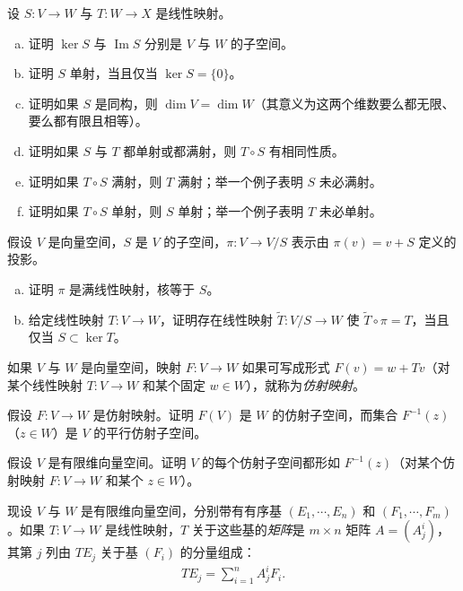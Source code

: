 \documentclass[../../main.tex]{subfiles}
\begin{document}
\begin{exercise}\label{exercise:appB-B-14}
设 $S:V\to W$ 与 $T:W\to X$ 是线性映射。
\begin{enumerate}[(a)]
\item 证明 $\ker S$ 与 $\operatorname{Im}S$ 分别是 $V$ 与 $W$ 的子空间。
\item 证明 $S$ 单射，当且仅当 $\ker S=\{0\}$。
\item 证明如果 $S$ 是同构，则 $\dim V=\dim W$（其意义为这两个维数要么都无限、要么都有限且相等）。
\item 证明如果 $S$ 与 $T$ 都单射或都满射，则 $T\circ S$ 有相同性质。
\item 证明如果 $T\circ S$ 满射，则 $T$ 满射；举一个例子表明 $S$ 未必满射。
\item 证明如果 $T\circ S$ 单射，则 $S$ 单射；举一个例子表明 $T$ 未必单射。
\end{enumerate}
\end{exercise}

\begin{exercise}\label{exercise:appB-B-15}
假设 $V$ 是向量空间，$S$ 是 $V$ 的子空间，$\pi:V\to V/S$ 表示由 $\pi(v)=v+S$ 定义的投影。
\begin{enumerate}[(a)]
\item 证明 $\pi$ 是满线性映射，核等于 $S$。
\item 给定线性映射 $T:V\to W$，证明存在线性映射 $\widetilde T:V/S\to W$ 使 $\widetilde T\circ\pi=T$，当且仅当 $S\subset\ker T$。
\end{enumerate}
\end{exercise}

如果 $V$ 与 $W$ 是向量空间，映射 $F:V\to W$ 如果可写成形式 $F(v)=w+Tv$（对某个线性映射 $T:V\to W$ 和某个固定 $w\in W$），就称为\emph{仿射映射}。

\begin{exercise}\label{exercise:appB-B-16}
假设 $F:V\to W$ 是仿射映射。证明 $F(V)$ 是 $W$ 的仿射子空间，而集合 $F^{-1}(z)$（$z\in W$）是 $V$ 的平行仿射子空间。
\end{exercise}

\begin{exercise}\label{exercise:appB-B-17}
假设 $V$ 是有限维向量空间。证明 $V$ 的每个仿射子空间都形如 $F^{-1}(z)$（对某个仿射映射 $F:V\to W$ 和某个 $z\in W$）。
\end{exercise}

现设 $V$ 与 $W$ 是有限维向量空间，分别带有有序基 $(E_1,\cdots ,E_n)$ 和 $(F_1,\cdots ,F_m)$。如果 $T:V\to W$ 是线性映射，$T$ 关于这些基的\emph{矩阵}是 $m\times n$ 矩阵 $A=(A^i_j)$，其第 $j$ 列由 $TE_j$ 关于基 $(F_i)$ 的分量组成：
\begin{align*}
TE_j=\sum_{i=1}^n A^i_j F_i.
\end{align*}
\end{document}

